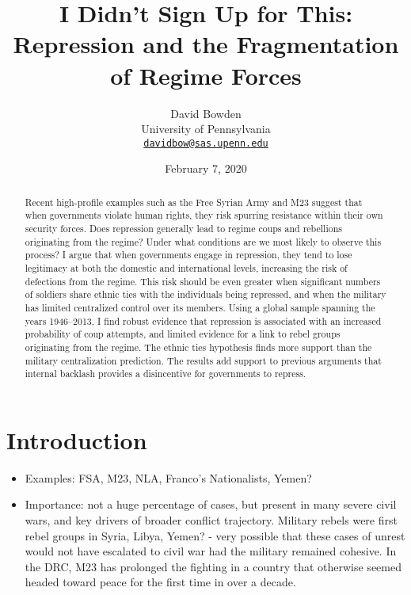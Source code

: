 \documentclass[
  12pt,
]{article}
\title{I Didn't Sign Up for This: Repression and the Fragmentation of Regime Forces}
\author{David Bowden\\
University of Pennsylvania\\
\href{mailto:davidbow@sas.upenn.edu}{\nolinkurl{davidbow@sas.upenn.edu}}}
\date{February 7, 2020}
\providecommand{\tightlist}{%
  \setlength{\itemsep}{0pt}\setlength{\parskip}{0pt}}
\begin{document}
\maketitle
\begin{abstract}
Recent high-profile examples such as the Free Syrian Army and M23 suggest that when governments violate human rights, they risk spurring resistance within their own security forces. Does repression generally lead to regime coups and rebellions originating from the regime? Under what conditions are we most likely to observe this process? I argue that when governments engage in repression, they tend to lose legitimacy at both the domestic and international levels, increasing the risk of defections from the regime. This risk should be even greater when significant numbers of soldiers share ethnic ties with the individuals being repressed, and when the military has limited centralized control over its members. Using a global sample spanning the years 1946--2013, I find robust evidence that repression is associated with an increased probability of coup attempts, and limited evidence for a link to rebel groups originating from the regime. The ethnic ties hypothesis finds more support than the military centralization prediction. The results add support to previous arguments that internal backlash provides a disincentive for governments to repress.
\end{abstract}

\doublespacing

\setlength{\parindent}{1cm}

\hypertarget{introduction}{%
\section{Introduction}\label{introduction}}

\begin{itemize}
\tightlist
\item
  Examples: FSA, M23, NLA, Franco's Nationalists, Yemen?
\item
  Importance: not a huge percentage of cases, but present in many severe civil wars, and key drivers of broader conflict trajectory. Military rebels were first rebel groups in Syria, Libya, Yemen? - very possible that these cases of unrest would not have escalated to civil war had the military remained cohesive. In the DRC, M23 has prolonged the fighting in a country that otherwise seemed headed toward peace for the first time in over a decade.
\end{itemize}
\end{document}
